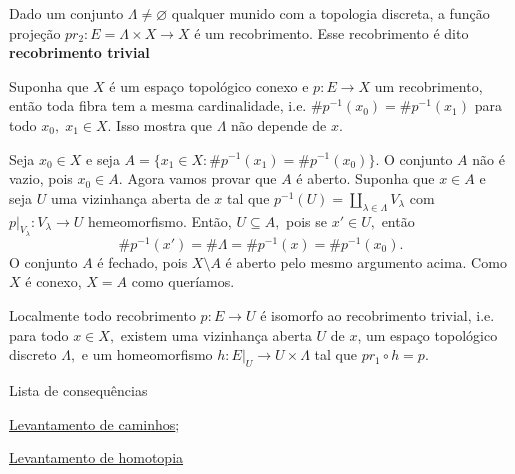 \begin{ex}
    Dado um conjunto $\Lambda\ne \varnothing$ qualquer munido com a topologia discreta, a função projeção $pr_2:E=\Lambda\times X\rightarrow X$ é um recobrimento. Esse recobrimento é dito \textbf{recobrimento trivial}
\end{ex}

\begin{prop}
    Suponha que $X$ é um espaço topológico conexo e $p:E\rightarrow X$ um recobrimento, então toda fibra tem a mesma cardinalidade, i.e. $\# p^{-1}(x_0)=\# p^{-1}(x_1)$ para todo $x_0,\;x_1\in X.$ Isso mostra que $\Lambda$ não depende de $x$.
\end{prop}

\begin{dem}
    Seja $x_0\in X$ e seja $A=\{x_1\in X: \#p^{-1}(x_1)=\# p^{-1}(x_0)\}.$ O conjunto $A$ não é vazio, pois $x_0\in A.$ Agora vamos provar que $A$ é aberto. Suponha que $x\in A$ e seja $U$ uma vizinhança aberta de $x$ tal que $p^{-1}(U)=\amalg_{\lambda\in \Lambda} V_\lambda$ com $p|_{V_\lambda}:V_\lambda\rightarrow U$ hemeomorfismo. Então, $U\subseteq A,$ pois se $x'\in U,$ então 
    $$\# p^{-1}(x')=\# \Lambda=\# p^{-1}(x)=\# p^{-1}(x_0).$$
    O conjunto $A$ é fechado, pois $X\setminus A$ é aberto pelo mesmo argumento acima. Como $X$ é conexo, $X=A$ como queríamos. 
\end{dem}

\begin{nota}
    Localmente todo recobrimento $p:E\rightarrow U$ é isomorfo ao recobrimento trivial, i.e. para todo $x\in X,$ existem uma vizinhança aberta $U$ de $x$, um espaço topológico discreto $\Lambda,$ e um homeomorfismo $h: E|_U\rightarrow U\times \Lambda$ tal que $pr_1\circ h= p.$
\end{nota}

\begin{titlemize}{Lista de consequências}
	\item \hyperref[levantamento-de-caminhos]{Levantamento de caminhos};\\ %
	\item \hyperref[levantamento-de-homotopia]{Levantamento de homotopia}
\end{titlemize}
